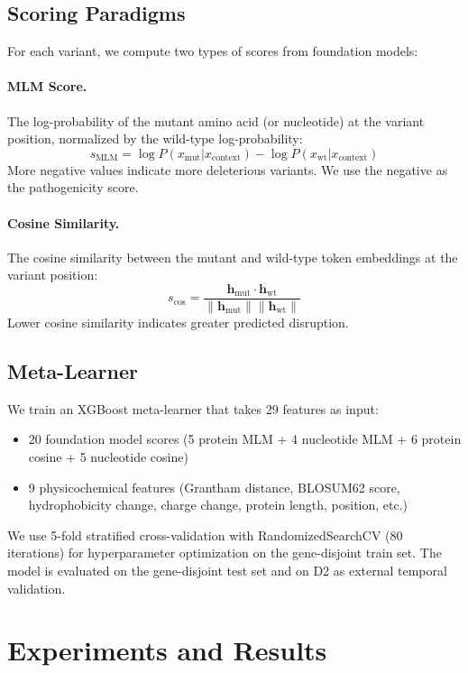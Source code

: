 \documentclass{article}
\begin{document}
\subsection{Scoring Paradigms}

For each variant, we compute two types of scores from foundation models:

\paragraph{MLM Score.} The log-probability of the mutant amino acid (or nucleotide) at the variant position, normalized by the wild-type log-probability:
\[
s_{\text{MLM}} = \log P(x_{\text{mut}} | x_{\text{context}}) - \log P(x_{\text{wt}} | x_{\text{context}})
\]
More negative values indicate more deleterious variants. We use the negative as the pathogenicity score.

\paragraph{Cosine Similarity.} The cosine similarity between the mutant and wild-type token embeddings at the variant position:
\[
s_{\text{cos}} = \frac{\mathbf{h}_{\text{mut}} \cdot \mathbf{h}_{\text{wt}}}{\|\mathbf{h}_{\text{mut}}\| \|\mathbf{h}_{\text{wt}}\|}
\]
Lower cosine similarity indicates greater predicted disruption.

\subsection{Meta-Learner}

We train an XGBoost meta-learner that takes 29 features as input:
\begin{itemize}
    \item 20 foundation model scores (5 protein MLM + 4 nucleotide MLM + 6 protein cosine + 5 nucleotide cosine)
    \item 9 physicochemical features (Grantham distance, BLOSUM62 score, hydrophobicity change, charge change, protein length, position, etc.)
\end{itemize}

We use 5-fold stratified cross-validation with RandomizedSearchCV (80 iterations) for hyperparameter optimization on the gene-disjoint train set. The model is evaluated on the gene-disjoint test set and on D2 as external temporal validation.

\section{Experiments and Results}
\end{document}
